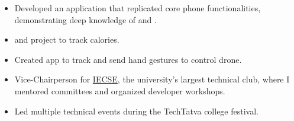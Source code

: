  
\begin{itemize}
    \item Developed an  application that replicated core phone functionalities, demonstrating deep knowledge of  and .
 \end{itemize}
 \begin{itemize}
    \item {} and  project to track calories.
\end{itemize}
\begin{itemize}
   \item Created  app to track and send hand gestures to control drone.
\end{itemize}

\begin{itemize}
    \item Vice-Chairperson for \href{https://iecsemanipal.com/}{IECSE}, the university's largest technical club, where I mentored committees and organized developer workshops.
    \item Led multiple technical events during the TechTatva college festival.
\end{itemize}